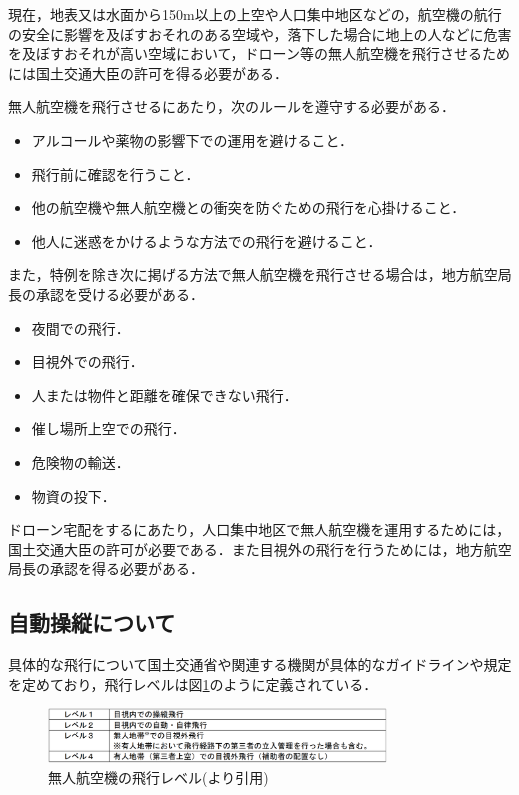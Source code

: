 \documentclass[a4paper, titlepage]{jsarticle}
\begin{document}
現在，地表又は水面から150m以上の上空や人口集中地区などの，航空機の航行の安全に影響を及ぼすおそれのある空域や，落下した場合に地上の人などに危害を及ぼすおそれが高い空域において，ドローン等の無人航空機を飛行させるためには国土交通大臣の許可を得る必要がある．

無人航空機を飛行させるにあたり，次のルールを遵守する必要がある．\cite{prohibited_guidelines}
\begin{itemize}
  \item アルコールや薬物の影響下での運用を避けること．
  \item 飛行前に確認を行うこと．
  \item 他の航空機や無人航空機との衝突を防ぐための飛行を心掛けること．
  \item 他人に迷惑をかけるような方法での飛行を避けること．
\end{itemize}
また，特例を除き次に掲げる方法で無人航空機を飛行させる場合は，地方航空局長の承認を受ける必要がある．
\begin{itemize}
  \item 夜間での飛行．
  \item 目視外での飛行．
  \item 人または物件と距離を確保できない飛行．
  \item 催し場所上空での飛行．
  \item 危険物の輸送．
  \item 物資の投下．
\end{itemize}

ドローン宅配をするにあたり，人口集中地区で無人航空機を運用するためには，国土交通大臣の許可が必要である．また目視外の飛行を行うためには，地方航空局長の承認を得る必要がある．

\subsection{自動操縦について}
具体的な飛行について国土交通省や関連する機関が具体的なガイドラインや規定を定めており，飛行レベルは図\ref{fig:dron_level}のように定義されている．

\begin{figure}[htbp]
  \centering
  \includegraphics[width=0.8\textwidth]{flying_level.pdf}
  \caption{無人航空機の飛行レベル(\cite{delivery_guidelines_2023}より引用)}
  \label{fig:dron_level}
\end{figure}
\end{document}
